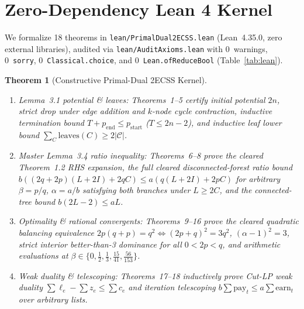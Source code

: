 \documentclass[11pt,twocolumn]{article}
\newtheorem{theorem}{Theorem}
\begin{document}
\section{Zero-Dependency Lean 4 Kernel}\label{sec:lean}
We formalize 18 theorems in \texttt{lean/PrimalDual2ECSS.lean} (Lean~4.35.0, zero external libraries), audited via \texttt{lean/AuditAxioms.lean} with 0~warnings, 0~\texttt{sorry}, 0~\texttt{Classical.choice}, and 0~\texttt{Lean.ofReduceBool} (Table~\ref{tab:lean}).

\begin{theorem}[Constructive Primal-Dual 2ECSS Kernel]\label{thm:lean}
\leavevmode
\begin{enumerate}[leftmargin=*,nosep]
  \item \emph{Lemma~3.1 potential \& leaves:} Theorems~1--5 certify initial potential $2n$, strict drop under edge addition and $k$-node cycle contraction, inductive termination bound $T + p_{\mathrm{end}} \le p_{\mathrm{start}}$ ($T \le 2n - 2$), and inductive leaf lower bound $\sum_{C} \mathrm{leaves}(C) \ge 2|\mathcal{C}|$.
  \item \emph{Master Lemma~3.4 ratio inequality:} Theorems~6--8 prove the cleared Theorem~1.2 RHS expansion, the full cleared disconnected-forest ratio bound $b((2q+2p)(L+2I) + 2qC) \le a(q(L+2I) + 2pC)$ for arbitrary $\beta = p/q$, $\alpha = a/b$ satisfying both branches under $L \ge 2C$, and the connected-tree bound $b(2L-2) \le aL$.
  \item \emph{Optimality \& rational convergents:} Theorems~9--16 prove the cleared quadratic balancing equivalence $2p(q+p)=q^2 \iff (2p+q)^2 = 3q^2$, $(\alpha - 1)^2 = 3$, strict interior better-than-3 dominance for all $0 < 2p < q$, and arithmetic evaluations at $\beta \in \{0, \frac{1}{2}, \frac{1}{3}, \frac{15}{41}, \frac{56}{153}\}$.
  \item \emph{Weak duality \& telescoping:} Theorems~17--18 inductively prove Cut-LP weak duality $\sum \ell_e - \sum z_e \le \sum c_e$ and iteration telescoping $b\sum \mathrm{pay}_t \le a\sum \mathrm{earn}_t$ over arbitrary lists.
\end{enumerate}
\end{theorem}
\end{document}
